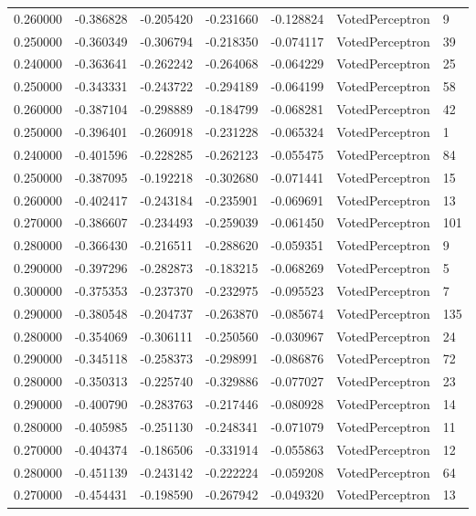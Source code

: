 \begin{tabular}{rrrrrll}
0.260000 & -0.386828 & -0.205420 & -0.231660 & -0.128824 & VotedPerceptron & 9 \\
0.250000 & -0.360349 & -0.306794 & -0.218350 & -0.074117 & VotedPerceptron & 39 \\
0.240000 & -0.363641 & -0.262242 & -0.264068 & -0.064229 & VotedPerceptron & 25 \\
0.250000 & -0.343331 & -0.243722 & -0.294189 & -0.064199 & VotedPerceptron & 58 \\
0.260000 & -0.387104 & -0.298889 & -0.184799 & -0.068281 & VotedPerceptron & 42 \\
0.250000 & -0.396401 & -0.260918 & -0.231228 & -0.065324 & VotedPerceptron & 1 \\
0.240000 & -0.401596 & -0.228285 & -0.262123 & -0.055475 & VotedPerceptron & 84 \\
0.250000 & -0.387095 & -0.192218 & -0.302680 & -0.071441 & VotedPerceptron & 15 \\
0.260000 & -0.402417 & -0.243184 & -0.235901 & -0.069691 & VotedPerceptron & 13 \\
0.270000 & -0.386607 & -0.234493 & -0.259039 & -0.061450 & VotedPerceptron & 101 \\
0.280000 & -0.366430 & -0.216511 & -0.288620 & -0.059351 & VotedPerceptron & 9 \\
0.290000 & -0.397296 & -0.282873 & -0.183215 & -0.068269 & VotedPerceptron & 5 \\
0.300000 & -0.375353 & -0.237370 & -0.232975 & -0.095523 & VotedPerceptron & 7 \\
0.290000 & -0.380548 & -0.204737 & -0.263870 & -0.085674 & VotedPerceptron & 135 \\
0.280000 & -0.354069 & -0.306111 & -0.250560 & -0.030967 & VotedPerceptron & 24 \\
0.290000 & -0.345118 & -0.258373 & -0.298991 & -0.086876 & VotedPerceptron & 72 \\
0.280000 & -0.350313 & -0.225740 & -0.329886 & -0.077027 & VotedPerceptron & 23 \\
0.290000 & -0.400790 & -0.283763 & -0.217446 & -0.080928 & VotedPerceptron & 14 \\
0.280000 & -0.405985 & -0.251130 & -0.248341 & -0.071079 & VotedPerceptron & 11 \\
0.270000 & -0.404374 & -0.186506 & -0.331914 & -0.055863 & VotedPerceptron & 12 \\
0.280000 & -0.451139 & -0.243142 & -0.222224 & -0.059208 & VotedPerceptron & 64 \\
0.270000 & -0.454431 & -0.198590 & -0.267942 & -0.049320 & VotedPerceptron & 13 \\

\end{tabular}

